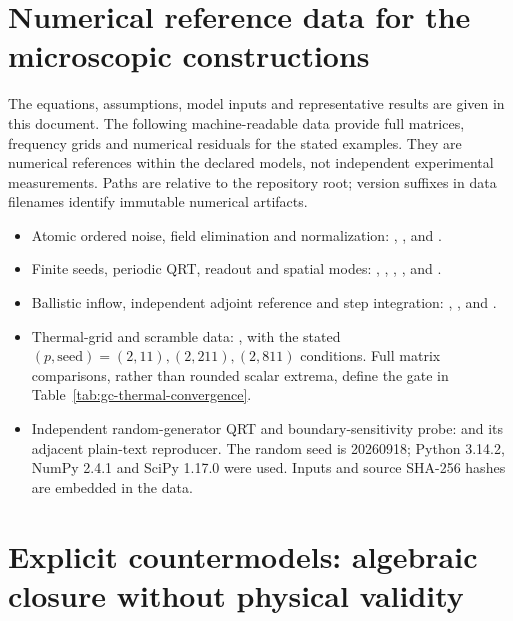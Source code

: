 \documentclass[11pt,a4paper]{article}
\begin{document}
\section{Numerical reference data for the microscopic constructions}
\label{app:gc-data}
The equations, assumptions, model inputs and representative results are given
in this document. The following machine-readable data provide full matrices,
frequency grids and numerical residuals for the stated examples. They are
numerical references within the declared models, not independent experimental
measurements. Paths are relative to the repository root; version suffixes in
data filenames identify immutable numerical artifacts.
\begingroup\raggedright
\begin{itemize}
\item Atomic ordered noise, field elimination and normalization:
,
, and
.
\item Finite seeds, periodic QRT, readout and spatial modes:
,
,
,
, and
.
\item Ballistic inflow, independent adjoint reference and step integration:
,
, and
.
\item Thermal-grid and scramble data:
, with the stated
$(p,\mathrm{seed})=(2,11),(2,211),(2,811)$ conditions. Full matrix
comparisons, rather than rounded scalar extrema, define the gate in
Table~\ref{tab:gc-thermal-convergence}.
\item Independent random-generator QRT and boundary-sensitivity probe:
and its adjacent plain-text reproducer. The random seed is 20260918;
Python 3.14.2, NumPy 2.4.1 and SciPy 1.17.0 were used. Inputs and source
SHA-256 hashes are embedded in the data.
\end{itemize}
\endgroup

\section{Explicit countermodels: algebraic closure without physical validity}
\label{app:gc-countermodels}
\end{document}

